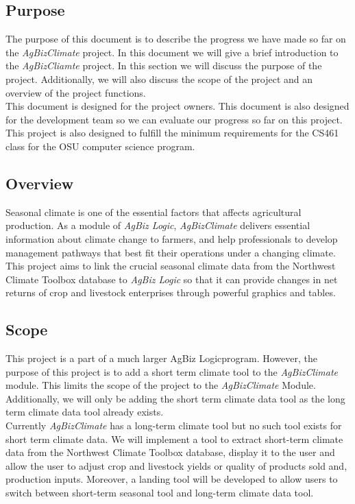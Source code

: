 \documentclass[onecolumn, draftclsnofoot,10pt, compsoc]{article}
\begin{document}
	\subsection{Purpose}
		The purpose of this document is to describe the progress we have made so far on the \textit{AgBizClimate} project. In this document we will give a brief introduction to the \textit{AgBizCliamte} project. In this section we will discuss the purpose of the project. Additionally, we will also discuss the scope of the project and an overview of the project functions.\\
		This document is designed for the project owners. This document is also designed for the development team so we can evaluate our progress so far on this project. This project is also designed to fulfill the minimum requirements for the CS461 class for the OSU computer science program.\\

				\subsection{Overview}
			Seasonal climate is one of the essential factors that affects agricultural production. As a module of \textit{AgBiz Logic}, \textit{AgBizClimate} delivers essential information about climate change to farmers, and help professionals to develop management pathways that best fit their operations under a changing climate. This project aims to link the crucial seasonal climate data from the Northwest Climate Toolbox database to \textit{AgBiz Logic} so that it can provide changes in net returns of crop and livestock enterprises through powerful graphics and tables.\\

		\subsection{Scope}
			This project is a part of a much larger AgBiz Logic\texttrademark program. However, the purpose of this project is to add a short term climate tool to the \textit{AgBizClimate} module. This limits the scope of the project to the \textit{AgBizClimate} Module. Additionally, we will only be adding the short term climate data tool as the long term climate data tool already exists.\\

			Currently \textit{AgBizClimate} has a long-term climate tool but no such tool exists for short term climate data. We will implement a tool to extract short-term climate data from the Northwest Climate Toolbox database, display it to the user and allow the user to adjust crop and livestock yields or quality of products sold and, production inputs. Moreover, a landing tool will be developed to allow users to switch between short-term seasonal tool and long-term climate data tool.\\
\end{document}
